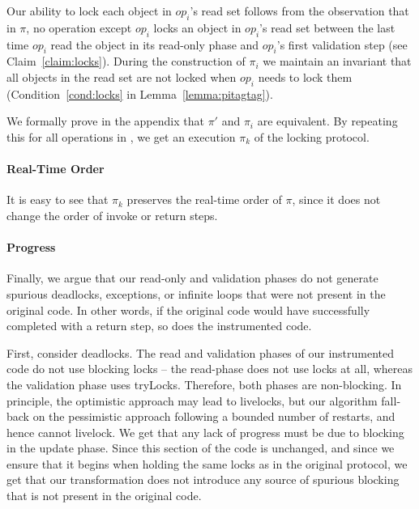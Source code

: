 {Our ability to lock each object in $op_i$'s read set follows from the
observation that in $\pi$, no operation except $op_i$ locks an object in
$op_i$'s read set between the last time $op_i$ read the object in its
read-only phase and $op_i$'s first validation step (see Claim~\ref{claim:locks}).
During the construction of $\pi_i$ we maintain
an invariant that all objects in the read set are not locked when $op_i$ needs
to lock them (Condition~\ref{cond:locks} in Lemma~\ref{lemma:pitagtag}).


We formally prove in the appendix that $\pi'$ and $\pi_i$ are equivalent.
By repeating this for all operations in \op, we get an execution $\pi_k$ of the locking protocol.

\paragraph{Real-Time Order}
It is easy to see that $\pi_k$ preserves the real-time order of $\pi$, since it does not change the order of invoke or return steps.
}

\paragraph{Progress}
Finally, we argue that our read-only and validation phases do not generate spurious deadlocks, exceptions,
or infinite loops that were not present in the original code. In other words, if the original code would have
successfully completed with a return step, so does the instrumented code.

First, consider deadlocks.
The read and validation phases of our instrumented code do not use blocking locks -- the read-phase does not use locks at all, whereas the
validation phase uses tryLocks. Therefore, both phases are non-blocking. In principle, the optimistic approach may lead to livelocks, but
our algorithm fall-back on the pessimistic approach following a bounded number of restarts, and hence cannot livelock.
We get that any lack
of progress must be due to blocking in the update phase. Since this section of the code is unchanged, and
since we ensure that it begins when holding the same locks as in the original protocol, we get that our transformation does not introduce any
source of spurious blocking that is not present in the original  code.

